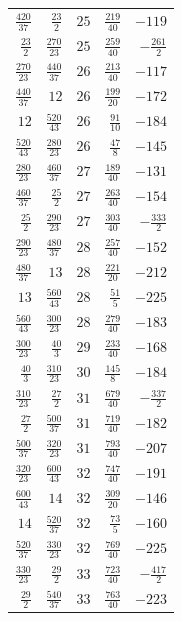 {\begin{longtable}{@{\extracolsep{\fill}}rrrrr}
$\frac{420}{37}$ & $\frac{23}{2}$ & $25$ & $\frac{219}{40}$ & $-119$ \\
$\frac{23}{2}$ & $\frac{270}{23}$ & $25$ & $\frac{259}{40}$ & $-\frac{261}{2}$ \\
$\frac{270}{23}$ & $\frac{440}{37}$ & $26$ & $\frac{213}{40}$ & $-117$ \\
$\frac{440}{37}$ & $12$ & $26$ & $\frac{199}{20}$ & $-172$ \\
$12$ & $\frac{520}{43}$ & $26$ & $\frac{91}{10}$ & $-184$ \\
$\frac{520}{43}$ & $\frac{280}{23}$ & $26$ & $\frac{47}{8}$ & $-145$ \\
$\frac{280}{23}$ & $\frac{460}{37}$ & $27$ & $\frac{189}{40}$ & $-131$ \\
$\frac{460}{37}$ & $\frac{25}{2}$ & $27$ & $\frac{263}{40}$ & $-154$ \\
$\frac{25}{2}$ & $\frac{290}{23}$ & $27$ & $\frac{303}{40}$ & $-\frac{333}{2}$ \\
$\frac{290}{23}$ & $\frac{480}{37}$ & $28$ & $\frac{257}{40}$ & $-152$ \\
$\frac{480}{37}$ & $13$ & $28$ & $\frac{221}{20}$ & $-212$ \\
$13$ & $\frac{560}{43}$ & $28$ & $\frac{51}{5}$ & $-225$ \\
$\frac{560}{43}$ & $\frac{300}{23}$ & $28$ & $\frac{279}{40}$ & $-183$ \\
$\frac{300}{23}$ & $\frac{40}{3}$ & $29$ & $\frac{233}{40}$ & $-168$ \\
$\frac{40}{3}$ & $\frac{310}{23}$ & $30$ & $\frac{145}{8}$ & $-184$ \\
$\frac{310}{23}$ & $\frac{27}{2}$ & $31$ & $\frac{679}{40}$ & $-\frac{337}{2}$ \\
$\frac{27}{2}$ & $\frac{500}{37}$ & $31$ & $\frac{719}{40}$ & $-182$ \\
$\frac{500}{37}$ & $\frac{320}{23}$ & $31$ & $\frac{793}{40}$ & $-207$ \\
$\frac{320}{23}$ & $\frac{600}{43}$ & $32$ & $\frac{747}{40}$ & $-191$ \\
$\frac{600}{43}$ & $14$ & $32$ & $\frac{309}{20}$ & $-146$ \\
$14$ & $\frac{520}{37}$ & $32$ & $\frac{73}{5}$ & $-160$ \\
$\frac{520}{37}$ & $\frac{330}{23}$ & $32$ & $\frac{769}{40}$ & $-225$ \\
$\frac{330}{23}$ & $\frac{29}{2}$ & $33$ & $\frac{723}{40}$ & $-\frac{417}{2}$ \\
$\frac{29}{2}$ & $\frac{540}{37}$ & $33$ & $\frac{763}{40}$ & $-223$ \\

\end{longtable}}
